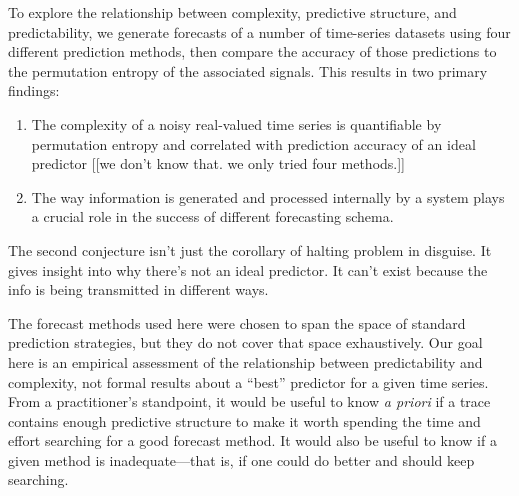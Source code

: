To explore the relationship between complexity, predictive structure,
and predictability, we generate forecasts of a number of time-series
datasets using four different prediction methods, then compare the
accuracy of those predictions to the permutation entropy of the
associated signals.  This results in two primary findings:
\begin{enumerate}
\item The complexity of a noisy real-valued time series is
  quantifiable by permutation entropy and correlated with prediction
  accuracy of an ideal predictor [[we don't know that.  we only tried
      four methods.]]
\item The way information is generated and processed internally by a
  system plays a crucial role in the success of different forecasting
  schema.
\end{enumerate}

The second conjecture isn't just the corollary of halting problem in
disguise.  It gives insight into why there's not an ideal predictor.
It can't exist because the info is being transmitted in different
ways.

The forecast methods used here were chosen to span the space of
standard prediction strategies, but they do not cover that space
exhaustively.  Our goal here is an empirical assessment of the
relationship between predictability and complexity, not formal results
about a ``best'' predictor for a given time series.  From a
practitioner's standpoint, it would be useful to know {\sl a priori}
if a trace contains enough predictive structure to make it worth
spending the time and effort searching for a good forecast method.  It
would also be useful to know if a given method is inadequate---that
is, if one could do better and should keep searching.


